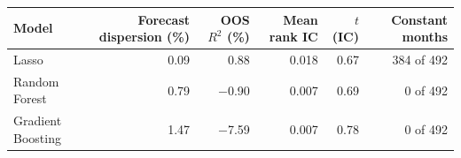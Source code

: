 \begin{tabular}{lrrrrr}
\toprule
Model & Forecast dispersion (\%) & OOS $R^2$ (\%) & Mean rank IC & $t$(IC) & Constant months \\
\midrule
Lasso & 0.09 & 0.88 & 0.018 & 0.67 & 384 of 492 \\
Random Forest & 0.79 & $-$0.90 & 0.007 & 0.69 & 0 of 492 \\
Gradient Boosting & 1.47 & $-$7.59 & 0.007 & 0.78 & 0 of 492 \\
\bottomrule
\end{tabular}
